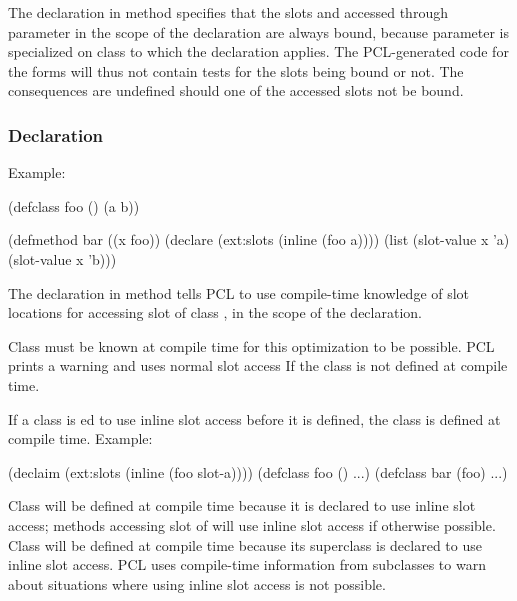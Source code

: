 The  declaration in method  specifies that
the slots  and  accessed through parameter  in
the scope of the declaration are always bound, because parameter
 is specialized on class  to which the
 declaration applies.  The PCL-generated code for
the  forms will thus not contain tests for the slots
being bound or not.  The consequences are undefined should one of the
accessed slots not be bound.



\subsubsection{ Declaration}

Example:

\begin{example}
(defclass foo ()
  (a b))

(defmethod bar ((x foo))
  (declare (ext:slots (inline (foo a))))
  (list (slot-value x 'a) (slot-value x 'b)))
\end{example}

The  declaration in method  tells PCL to use
compile-time knowledge of slot locations for accessing slot 
of class , in the scope of the declaration.

Class  must be known at compile time for this optimization
to be possible.  PCL prints a warning and uses normal slot access If
the class is not defined at compile time.

If a class is ed to use inline slot access before it is
defined, the class is defined at compile time.  Example:

\begin{example}
(declaim (ext:slots (inline (foo slot-a))))
(defclass foo () ...)
(defclass bar (foo) ...)
\end{example}
  
Class  will be defined at compile time because it is
declared to use inline slot access; methods accessing slot
 of  will use inline slot access if otherwise
possible.  Class  will be defined at compile time because
its superclass  is declared to use inline slot access.  PCL
uses compile-time information from subclasses to warn about situations
where using inline slot access is not possible.

